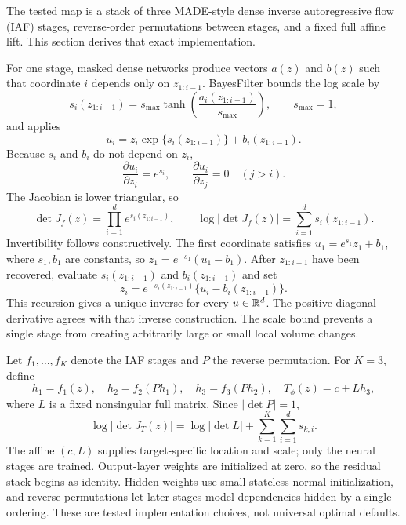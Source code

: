 The tested map is a stack of three MADE-style dense inverse autoregressive flow
(IAF) stages, reverse-order permutations between stages, and a fixed full
affine lift.  This section derives that exact implementation.

For one stage, masked dense networks produce vectors $a(z)$ and $b(z)$ such
that coordinate $i$ depends only on $z_{1:i-1}$.  BayesFilter bounds the log
scale by
\begin{equation}
 s_i(z_{1:i-1})=s_{\max}\tanh\!\left(
   \frac{a_i(z_{1:i-1})}{s_{\max}}\right),\qquad s_{\max}=1,
\end{equation}
and applies
\begin{equation}
 u_i=z_i\exp\{s_i(z_{1:i-1})\}+b_i(z_{1:i-1}).
 \label{eq:bf-neutra-iaf-stage}
\end{equation}
Because $s_i$ and $b_i$ do not depend on $z_i$,
\begin{equation}
 \frac{\partial u_i}{\partial z_i}=e^{s_i},\qquad
 \frac{\partial u_i}{\partial z_j}=0\quad(j>i).
\end{equation}
The Jacobian is lower triangular, so
\begin{equation}
 \det J_f(z)=\prod_{i=1}^d e^{s_i(z_{1:i-1})},\qquad
 \log|\det J_f(z)|=\sum_{i=1}^d s_i(z_{1:i-1}).
 \label{eq:bf-neutra-iaf-logdet}
\end{equation}
Invertibility follows constructively.  The first coordinate satisfies
$u_1=e^{s_1}z_1+b_1$, where $s_1,b_1$ are constants, so
$z_1=e^{-s_1}(u_1-b_1)$.  After $z_{1:i-1}$ have been recovered, evaluate
$s_i(z_{1:i-1})$ and $b_i(z_{1:i-1})$ and set
\begin{equation}
 z_i=e^{-s_i(z_{1:i-1})}
 \{u_i-b_i(z_{1:i-1})\}.
\end{equation}
This recursion gives a unique inverse for every $u\in\mathbb{R}^d$.  The positive
diagonal derivative agrees with that inverse construction.  The scale bound
prevents a single stage from creating arbitrarily large or small local volume
changes.

Let $f_1,\ldots,f_K$ denote the IAF stages and $P$ the reverse permutation.
For $K=3$, define
\begin{equation}
 h_1=f_1(z),\quad h_2=f_2(Ph_1),\quad h_3=f_3(Ph_2),
 \quad T_\phi(z)=c+Lh_3,
 \label{eq:bf-neutra-stack}
\end{equation}
where $L$ is a fixed nonsingular full matrix.  Since $|\det P|=1$,
\begin{equation}
 \log|\det J_T(z)|=\log|\det L|+
 \sum_{k=1}^K\sum_{i=1}^d s_{k,i}.
 \label{eq:bf-neutra-stack-logdet}
\end{equation}
The affine $(c,L)$ supplies target-specific location and scale; only the neural
stages are trained.  Output-layer weights are initialized at zero, so the
residual stack begins as identity.  Hidden weights use small stateless-normal
initialization, and reverse permutations let later stages model dependencies
hidden by a single ordering.  These are tested implementation choices, not
universal optimal defaults.

